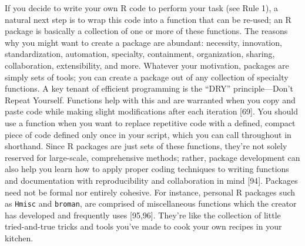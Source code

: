 \documentclass[10pt,letterpaper]{article}
\begin{document}
If you decide to write your own R code to perform your task (see Rule
1), a natural next step is to wrap this code into a function that can be
re-used; an R package is basically a collection of one or more of these
functions. The reasons why you might want to create a package are
abundant: necessity, innovation, standardization, automation, specialty,
containment, organization, sharing, collaboration, extensibility, and
more. Whatever your motivation, packages are simply sets of tools; you
can create a package out of any collection of specialty functions. A key
tenant of efficient programming is the ``DRY'' principle---Don't Repeat
Yourself. Functions help with this and are warranted when you copy and
paste code while making slight modifications after each iteration
{[}69{]}. You should use a function when you want to replace repetitive
code with a defined, compact piece of code defined only once in your
script, which you can call throughout in shorthand. Since R packages are
just sets of these functions, they're not solely reserved for
large-scale, comprehensive methods; rather, package development can also
help you learn how to apply proper coding techniques to writing
functions and documentation with reproducibility and collaboration in
mind {[}94{]}. Packages need not be formal nor entirely cohesive. For
instance, personal R packages such as \texttt{Hmisc} and
\texttt{broman}, are comprised of miscellaneous functions which the
creator has developed and frequently uses {[}95,96{]}. They're like the
collection of little tried-and-true tricks and tools you've made to cook
your own recipes in your kitchen.
\end{document}
